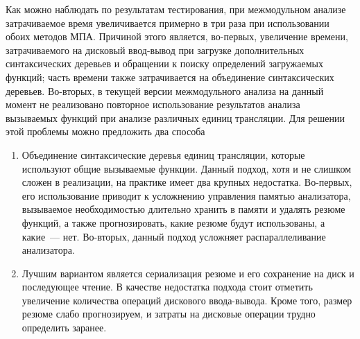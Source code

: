 Как можно наблюдать по результатам тестирования, при межмодульном анализе затрачиваемое время увеличивается примерно в три раза при использовании обоих методов МПА. Причиной этого является, во-первых, увеличение времени, затрачиваемого на дисковый ввод-вывод при загрузке дополнительных синтаксических деревьев и обращении к поиску определений загружаемых функций; часть времени также затрачивается на объединение синтаксических деревьев. Во-вторых, в текущей версии межмодульного анализа на данный момент не реализовано повторное использование результатов анализа вызываемых функций при анализе различных единиц трансляции. Для решении этой проблемы можно предложить два способа
\begin{enumerate}
 \item Объединение синтаксические деревья единиц трансляции, которые используют общие вызываемые функции. Данный подход, хотя и не слишком сложен в реализации, на практике имеет два крупных недостатка. Во-первых, его использование приводит к усложнению управления памятью анализатора, вызываемое необходимостью длительно хранить в памяти и удалять резюме функций, а также прогнозировать, какие резюме будут использованы, а какие~--- нет. Во-вторых, данный подход усложняет распараллеливание анализатора.
 \item Лучшим вариантом является сериализация резюме и его сохранение на диск и последующее чтение. В качестве недостатка подхода стоит отметить увеличение количества операций дискового ввода-вывода. Кроме того, размер резюме слабо прогнозируем, и затраты на дисковые операции трудно определить заранее.
\end{enumerate}
